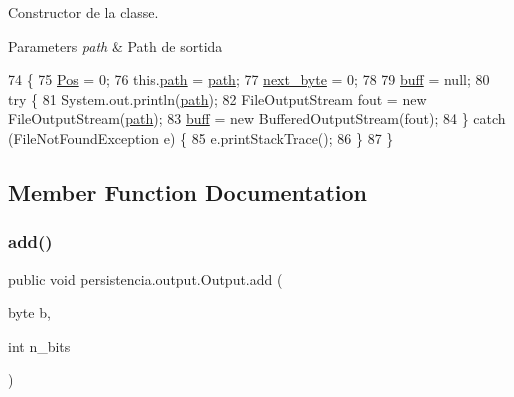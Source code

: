 Constructor de la classe. 


\begin{DoxyParams}{Parameters}
{\em path} & Path de sortida \\
\hline
\end{DoxyParams}

\begin{DoxyCode}
74                                 \{
75         \hyperlink{classpersistencia_1_1output_1_1Output_a3709182600423f7e57644ccdd0016f22}{Pos} = 0;
76         this.\hyperlink{classpersistencia_1_1output_1_1Output_aebef717882f3bcc7080dec014c6714c9}{path} = \hyperlink{classpersistencia_1_1output_1_1Output_aebef717882f3bcc7080dec014c6714c9}{path};
77         \hyperlink{classpersistencia_1_1output_1_1Output_aca83082ef84ec2e169b6fa34618d0773}{next\_byte} = 0;
78 
79         \hyperlink{classpersistencia_1_1output_1_1Output_ae8f22fd92b020c318f6f377cf3ac39de}{buff} = null;
80         \textcolor{keywordflow}{try} \{
81             System.out.println(\hyperlink{classpersistencia_1_1output_1_1Output_aebef717882f3bcc7080dec014c6714c9}{path});
82             FileOutputStream fout = \textcolor{keyword}{new} FileOutputStream(\hyperlink{classpersistencia_1_1output_1_1Output_aebef717882f3bcc7080dec014c6714c9}{path});
83             \hyperlink{classpersistencia_1_1output_1_1Output_ae8f22fd92b020c318f6f377cf3ac39de}{buff} = \textcolor{keyword}{new} BufferedOutputStream(fout);
84         \} \textcolor{keywordflow}{catch} (FileNotFoundException e) \{
85             e.printStackTrace();
86         \}
87     \}
\end{DoxyCode}


\subsection{Member Function Documentation}
\mbox{\label{classpersistencia_1_1output_1_1Output_adc03a0dd7a94da21fe8432064a4eec09}} 
\subsubsection{\texorpdfstring{add()}{add()}}
{\footnotesize\ttfamily public void persistencia.\+output.\+Output.\+add (\begin{DoxyParamCaption}\item[{byte}]{b,  }\item[{int}]{n\+\_\+bits }\end{DoxyParamCaption})\hspace{0.3cm}{\ttfamily [inline]}}



